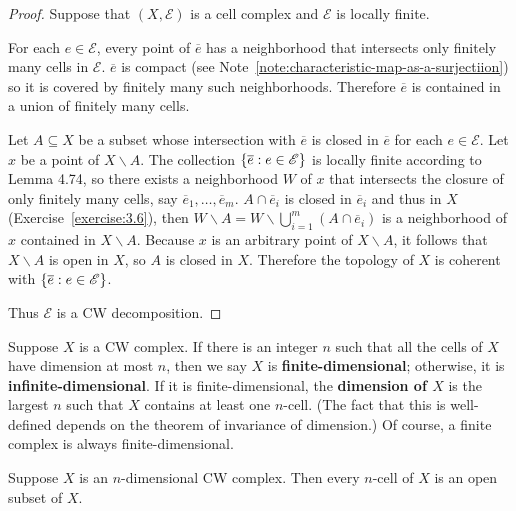 \begin{proof}
	Suppose that $(X, \mathscr{E})$ is a cell complex and $\mathscr{E}$ is locally finite.

	For each $e\in \mathscr{E}$, every point of $\overline{e}$ has a neighborhood that intersects only finitely many cells in $\mathscr{E}$. $\overline{e}$ is compact (see Note~\ref{note:characteristic-map-as-a-surjectiion}) so it is covered by finitely many such neighborhoods. Therefore $\overline{e}$ is contained in a union of finitely many cells.

	Let $A \subseteq X$ be a subset whose intersection with $\overline{e}$ is closed in $\overline{e}$ for each $e\in \mathscr{E}$. Let $x$ be a point of $X\smallsetminus A$. The collection $\left\{{ \overline{e} : e\in\mathscr{E} }\right\}$ is locally finite according to Lemma 4.74, so there exists a neighborhood $W$ of $x$ that intersects the closure of only finitely many cells, say $\overline{e}_{1}, \ldots, \overline{e}_{m}$. $A \cap \overline{e}_{i}$ is closed in $\overline{e}_{i}$ and thus in $X$ (Exercise~\ref{exercise:3.6}), then $W\smallsetminus A = W \smallsetminus \bigcup^{m}_{i=1}(A\cap \overline{e}_{i})$ is a neighborhood of $x$ contained in $X\smallsetminus A$. Because $x$ is an arbitrary point of $X\smallsetminus A$, it follows that $X\smallsetminus A$ is open in $X$, so $A$ is closed in $X$. Therefore the topology of $X$ is coherent with $\left\{{ \overline{e} : e \in \mathscr{E} }\right\}$.

	Thus $\mathscr{E}$ is a CW decomposition.
\end{proof}

Suppose $X$ is a CW complex. If there is an integer $n$ such that all the cells of $X$ have dimension at most $n$, then we say $X$ is \textbf{finite-dimensional}; otherwise, it is \textbf{infinite-dimensional}. If it is finite-dimensional, the \textbf{dimension of $X$} is the largest $n$ such that $X$ contains at least one $n$-cell. (The fact that this is well-defined depends on the theorem of invariance of dimension.) Of course, a finite complex is always finite-dimensional.

\begin{prop}{5.5}
	Suppose $X$ is an $n$-dimensional CW complex. Then every $n$-cell of $X$ is an open subset of $X$.
\end{prop}

